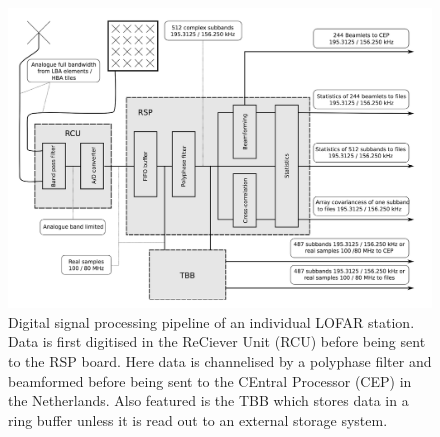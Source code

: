 \begin{figure}[t]
    \centering
    \includegraphics[width=0.75\columnwidth]{Images/Digital_signal_processing.png}
    \caption[Digital signal processing pipeline of an individual LOFAR station.]{Digital signal processing pipeline of an individual LOFAR station. Data is first digitised in the ReCiever Unit (RCU) before being sent to the RSP board. Here data is channelised by a polyphase filter and beamformed before being sent to the CEntral Processor (CEP) in the Netherlands. Also featured is the TBB which stores data in a ring buffer unless it is read out to an external storage system. }
    \label{fig:sig_pipe}
\end{figure}

